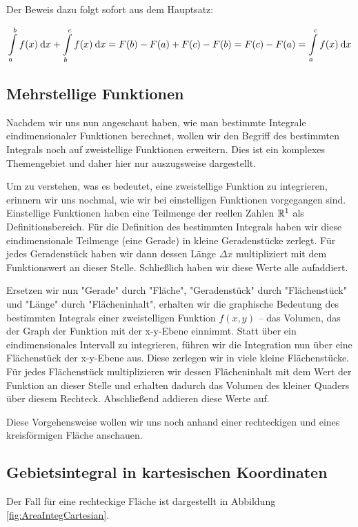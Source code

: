 Der Beweis dazu folgt sofort aus dem Hauptsatz:

$$
    \int\limits_a^b f(x) \:\mathrm{d}{x} + \int\limits_b^c f(x) \:\mathrm{d}{x} = F(b) - F(a) + F(c) - F(b) = F(c) - F(a) = \int\limits_a^c f(x) \:\mathrm{d}{x}
$$

\subsection{Mehrstellige Funktionen}


Nachdem wir uns nun angeschaut haben, wie man bestimmte Integrale eindimensionaler Funktionen berechnet, wollen wir den Begriff des bestimmten Integrals noch auf zweistellige Funktionen erweitern. Dies ist ein komplexes Themengebiet und daher hier nur auszugsweise dargestellt.

Um zu verstehen, was es bedeutet, eine zweistellige Funktion zu integrieren, erinnern wir uns nochmal, wie wir bei einstelligen Funktionen vorgegangen sind. Einstellige Funktionen haben eine Teilmenge der reellen Zahlen $\mathbb{R}^1$ als Definitionsbereich. Für die Definition des bestimmten Integrals haben wir diese eindimensionale Teilmenge (eine Gerade) in kleine Geradenstücke zerlegt. Für jedes Geradenstück haben wir dann dessen Länge $\Delta x$ multipliziert mit dem Funktionswert an dieser Stelle. Schließlich haben wir diese Werte alle aufaddiert.

Ersetzen wir nun "Gerade" durch "Fläche", "Geradenstück" durch "Flächenstück" und "Länge" durch "Flächeninhalt", erhalten wir die graphische Bedeutung des bestimmten Integrals einer zweistelligen Funktion $f(x,y)$ -- das Volumen, das der Graph der Funktion mit der x-y-Ebene einnimmt. Statt über ein eindimensionales Intervall zu integrieren, führen wir die Integration nun über eine Flächenstück der x-y-Ebene aus. Diese zerlegen wir in viele kleine Flächenstücke. Für jedes Flächenstück multiplizieren wir dessen Flächeninhalt mit dem Wert der Funktion an dieser Stelle und erhalten dadurch das Volumen des kleiner Quaders über diesem Rechteck. Abschließend addieren diese Werte auf.

Diese Vorgehensweise wollen wir uns noch anhand einer rechteckigen und eines kreisförmigen Fläche anschauen.

\subsection{Gebietsintegral in kartesischen Koordinaten}


Der Fall für eine rechteckige Fläche ist dargestellt in Abbildung \ref{fig:AreaIntegCartesian}.

